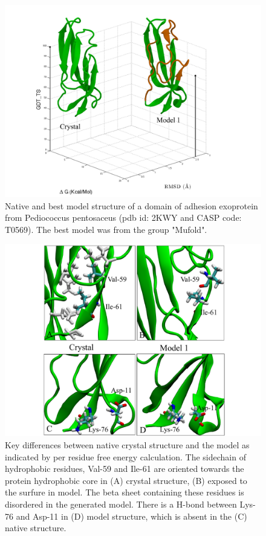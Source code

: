 \documentclass[12pt]{article}
\begin{document}
\begin{figure}
\begin{center}
\includegraphics[width=3.6 in,height=3.4 in]{T0569.pdf}
\end{center}
\caption{Native and best model structure of a domain of adhesion exoprotein from Pediococcus pentosaceus (pdb id: 2KWY and CASP code: T0569).
The best model was from the group "Mufold".}
\label{fig:T0569}
\end{figure}


\begin{figure}
\begin{center}
\includegraphics[width=5 in,height=4 in]{T0569_perres2.pdf}
\end{center}
\caption{Key differences between native crystal structure and the model as indicated by per residue free energy calculation.
The sidechain of hydrophobic residues, Val-59 and Ile-61 are oriented towards the protein hydrophobic core in (A) crystal 
structure, (B) exposed to the surfure in model. The beta sheet containing these residues is disordered in the generated model.
There is a H-bond between Lys-76 and Asp-11 in (D) model structure, which is absent in the (C) native structure.}
\label{fig:T0569_per_residue}
\end{figure}
\end{document}
